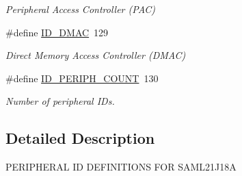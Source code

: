 \begin{DoxyCompactItemize}
\begin{DoxyCompactList}\small\item\em Peripheral Access Controller (P\+A\+C) \end{DoxyCompactList}\item 
\hypertarget{group___s_a_m_l21_j18_a__id_ga82f75d497cb286bddbeb5a4cc7acdf6c}{}\#define \hyperlink{group___s_a_m_l21_j18_a__id_ga82f75d497cb286bddbeb5a4cc7acdf6c}{I\+D\+\_\+\+D\+M\+A\+C}~129\label{group___s_a_m_l21_j18_a__id_ga82f75d497cb286bddbeb5a4cc7acdf6c}

\begin{DoxyCompactList}\small\item\em Direct Memory Access Controller (D\+M\+A\+C) \end{DoxyCompactList}\item 
\hypertarget{group___s_a_m_l21_j18_a__id_gad0762589e782b5eca161d9d344306da7}{}\#define \hyperlink{group___s_a_m_l21_j18_a__id_gad0762589e782b5eca161d9d344306da7}{I\+D\+\_\+\+P\+E\+R\+I\+P\+H\+\_\+\+C\+O\+U\+N\+T}~130\label{group___s_a_m_l21_j18_a__id_gad0762589e782b5eca161d9d344306da7}

\begin{DoxyCompactList}\small\item\em Number of peripheral I\+Ds. \end{DoxyCompactList}\end{DoxyCompactItemize}


\subsection{Detailed Description}
P\+E\+R\+I\+P\+H\+E\+R\+A\+L I\+D D\+E\+F\+I\+N\+I\+T\+I\+O\+N\+S F\+O\+R S\+A\+M\+L21\+J18\+A 